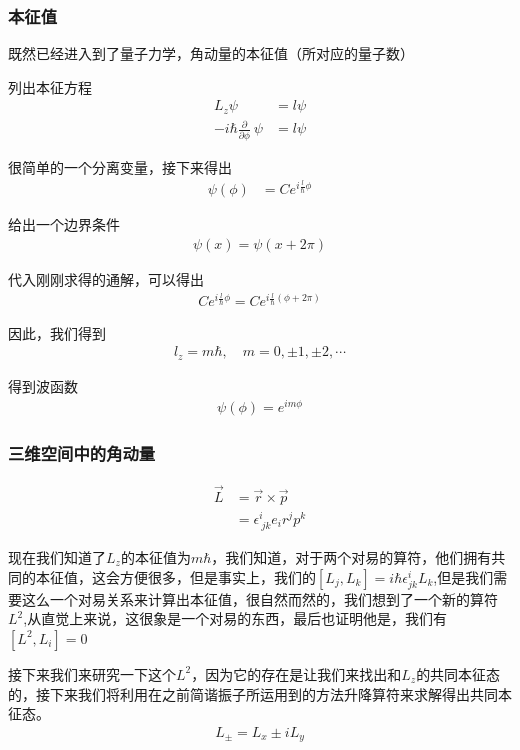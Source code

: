 \documentclass{article}
\newcommand{\Da}[2]{\frac{\partial}{\partial#2}#1}
\begin{document}
\subsubsection{本征值}
既然已经进入到了量子力学，角动量的本征值（所对应的量子数）

列出本征方程
\begin{align*}
	L_z\psi                 & =l\psi \\
	-i\hbar\Da{~}{\phi}\psi & =l\psi
\end{align*}

很简单的一个分离变量，接下来得出
\begin{align*}
	\psi(\phi) & =Ce^{i\frac{l}{\hbar}\phi}
\end{align*}

给出一个边界条件
\begin{align*}
	\psi(x)=\psi(x+2\pi)
\end{align*}

代入刚刚求得的通解，可以得出
\begin{align*}
	Ce^{i\frac{l}{\hbar}\phi}=Ce^{i\frac{l}{\hbar}(\phi+2\pi)}
\end{align*}

因此，我们得到
\begin{align*}
	l_z=m\hbar,\quad m=0,\pm 1,\pm 2,\cdots
\end{align*}

得到波函数
\begin{align*}
	\psi(\phi)=e^{im\phi}
\end{align*}

\subsubsection{三维空间中的角动量}
\begin{align*}
	\vec{L} & =\vec{r}\times\vec{p}         \\
	        & =\epsilon^{i}_{\ jk}e_ir^jp^k
\end{align*}

现在我们知道了$L_z$的本征值为$m\hbar$，我们知道，对于两个对易的算符，他们拥有共同的本征值，这会方便很多，但是事实上，我们的$[L_j,L_k]=i\hbar\epsilon^{i}_{jk}L_k$,但是我们需要这么一个对易关系来计算出本征值，很自然而然的，我们想到了一个新的算符$L^2$,从直觉上来说，这很象是一个对易的东西，最后也证明他是，我们有$[L^2,L_i]=0$

接下来我们来研究一下这个$L^2$，因为它的存在是让我们来找出和$L_z$的共同本征态的，接下来我们将利用在之前简谐振子所运用到的方法升降算符来求解得出共同本征态。
\begin{align*}
	L_{\pm}=L_x\pm iL_y
\end{align*}
\end{document}
